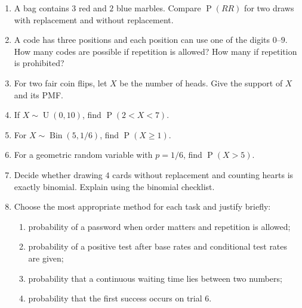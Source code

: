 \documentclass[11pt]{article}
\newcommand{\Pp}{\operatorname{P}}
\newcommand{\Bin}{\operatorname{Bin}}
\newcommand{\Unif}{\operatorname{U}}
\begin{document}
\begin{enumerate}
for $80\%$ of users and $20\%$ of nonusers.  Find the probability of a positive
response and then $\Pp(\text{user}\mid\text{positive})$.
\item A bag contains $3$ red and $2$ blue marbles.  Compare $\Pp(RR)$ for two
draws with replacement and without replacement.
\item A code has three positions and each position can use one of the digits
$0$--$9$.  How many codes are possible if repetition is allowed?  How many if
repetition is prohibited?
\item For two fair coin flips, let $X$ be the number of heads.  Give the support
of $X$ and its PMF.
\item If $X\sim\Unif(0,10)$, find $\Pp(2<X<7)$.
\item For $X\sim\Bin(5,1/6)$, find $\Pp(X\ge1)$.
\item For a geometric random variable with $p=1/6$, find $\Pp(X>5)$.
\item Decide whether drawing $4$ cards without replacement and counting hearts is
exactly binomial.  Explain using the binomial checklist.
\item Choose the most appropriate method for each task and justify briefly:
\begin{enumerate}[label=(\alph*)]
\item probability of a password when order matters and repetition is allowed;
\item probability of a positive test after base rates and conditional test rates
are given;
\item probability that a continuous waiting time lies between two numbers;
\item probability that the first success occurs on trial $6$.
\end{enumerate}
\end{enumerate}
\end{document}
